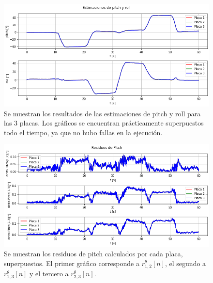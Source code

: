 \begin{figure}[htb]
    \centering
    \includegraphics[width=\textwidth]{img/resultados_pitch_roll_sin_fallas.png}
    \caption{Se muestran los resultados de las estimaciones de pitch y roll para las 3 placas. Los gráficos se encuentran prácticamente superpuestos todo el tiempo, ya que no hubo fallas en la ejecución.}
    \label{fig:resultados_pitch_roll_sin_fallas}
\end{figure}

\begin{figure}[htb]
    \centering
    \includegraphics[width=\textwidth]{img/resultados_residuos_pitch_sin_fallas.png}
    \caption{Se muestran los residuos de pitch calculados por cada placa, superpuestos. El primer gráfico corresponde a $r_{1,2}^{\theta}[n]$, el segundo a $r_{1,3}^{\theta}[n]$ y el tercero a $r_{2,3}^{\theta}[n]$.}
    \label{fig:resultados_residuos_pitch_sin_fallas}    
\end{figure}

